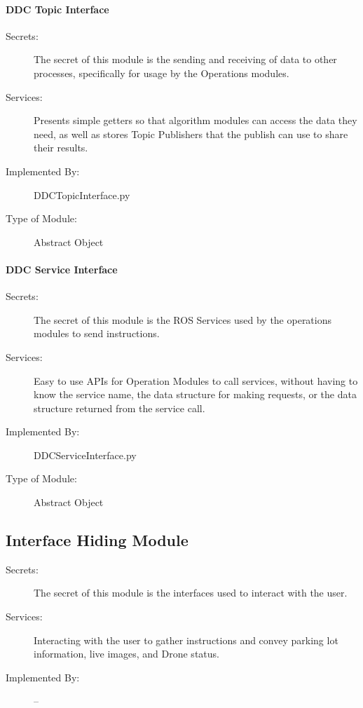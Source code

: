 \documentclass[12pt, titlepage]{article}
\begin{document}
\paragraph{DDC Topic Interface}
\label{DDC Topic Interface}
\begin{description}
\item[Secrets:] The secret of this module is the sending and receiving of data to other processes, specifically for usage by the Operations modules. 
\item[Services:] Presents simple getters so that algorithm modules can access the data they need, as well as stores Topic Publishers that the publish  can use to share their results.
\item[Implemented By:] DDCTopicInterface.py
\item[Type of Module:] Abstract Object
\end{description}

\paragraph{DDC Service Interface}
\label{DDC Service Interface}
\begin{description}
\item[Secrets:] The secret of this module is the ROS Services used by the operations modules to send instructions. 
\item[Services:] Easy to use APIs for Operation Modules to call services, without having to know the service name, the data structure for making requests, or the data structure returned from the service call.
\item[Implemented By:] DDCServiceInterface.py
\item[Type of Module:] Abstract Object
\end{description}


\subsection{Interface Hiding Module}
\begin{description}
\item[Secrets:] The secret of this module is the interfaces used to interact with the user.
\item[Services:] Interacting with the user to gather instructions and convey parking lot information, live images, and Drone status. 
\item[Implemented By:] --
\end{description}
\end{document}
